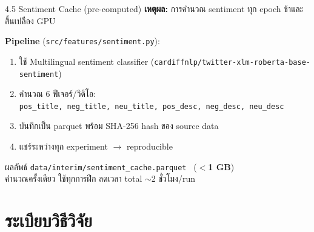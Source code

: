 \documentclass[aspectratio=169,11pt,xcolor=dvipsnames]{beamer}
\newcommand{\hl}[1]{\textcolor{kmitlOrange}{\textbf{#1}}}
\begin{document}
\begin{frame}{4.5 Sentiment Cache (pre-computed)}
  \textbf{เหตุผล:} การคำนวณ sentiment ทุก epoch ช้าและสิ้นเปลือง GPU
  \vspace{0.4em}

  \textbf{Pipeline} (\texttt{src/features/sentiment.py}):
  \begin{enumerate}
    \item ใช้ Multilingual sentiment classifier (\texttt{cardiffnlp/twitter-xlm-roberta-base-sentiment})
    \item คำนวณ 6 ฟีเจอร์/วิดีโอ:\\
      \texttt{pos\_title, neg\_title, neu\_title, pos\_desc, neg\_desc, neu\_desc}
    \item บันทึกเป็น parquet พร้อม SHA-256 hash ของ source data
    \item แชร์ระหว่างทุก experiment $\rightarrow$ reproducible
  \end{enumerate}
  \vspace{0.4em}
  \begin{block}{ผลลัพธ์}
    \texttt{data/interim/sentiment\_cache.parquet} \ (\hl{$<$1 GB})\\
    คำนวณครั้งเดียว ใช้ทุกการฝึก ลดเวลา total $\sim$2 ชั่วโมง/run
  \end{block}
\end{frame}

\section{ระเบียบวิธีวิจัย}
\end{document}
